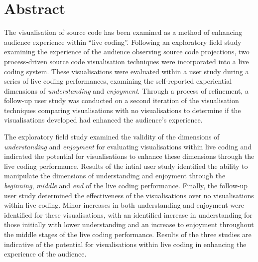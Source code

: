 
\chapter*{Abstract}
\label{chap:abstract}

The visualisation of source code has been examined as a method of enhancing audience experience within ``live coding''. Following an exploratory field study examining the experience of the audience observing source code projections, two process-driven source code visualisation techniques were incorporated into a live coding system. These visualisations were evaluated within a user study during a series of live coding performances, examining the self-reported experiential dimensions of \emph{understanding} and \emph{enjoyment}. Through a process of refinement, a follow-up user study was conducted on a second iteration of the visualisation techniques comparing visualisations with no visualisations to determine if the visualisations developed had enhanced the audience's experience.

The exploratory field study examined the validity of the dimensions of \emph{understanding} and \emph{enjoyment} for evaluating visualisations within live coding and indicated the potential for visualisations to enhance these dimensions through the live coding performance. Results of the intial user study identified the ability to manipulate the dimensions of understanding and enjoyment through the \emph{beginning}, \emph{middle} and \emph{end} of the live coding performance. Finally, the follow-up user study determined the effectiveness of the visualisations over no visualisations within live coding. Minor increases in both understanding and enjoyment were identified for these visualisations, with an identified increase in understanding for those initially with lower understanding and an increase to enjoyment throughout the middle stages of the live coding performance. Results of the three studies are indicative of the potential for visualisations within live coding in enhancing the experience of the audience. 

